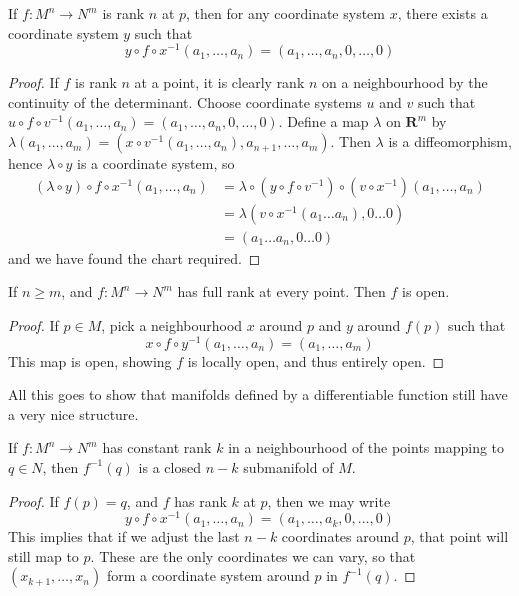 \begin{corollary}
    If $f: M^n \to N^m$ is rank $n$ at $p$, then for any coordinate system $x$, there exists a coordinate system $y$ such that
    \[ y \circ f \circ x^{-1} (a_1, \dots, a_n) = (a_1, \dots, a_n, 0, \dots, 0) \]
\end{corollary}
\begin{proof}
    If $f$ is rank $n$ at a point, it is clearly rank $n$ on a neighbourhood by the continuity of the determinant. Choose coordinate systems $u$ and $v$ such that $u \circ f \circ v^{-1}(a_1, \dots, a_n) = (a_1, \dots, a_n, 0, \dots, 0)$. Define a map $\lambda$ on $\mathbf{R}^m$ by $\lambda(a_1, \dots, a_m) = (x \circ v^{-1}(a_1, \dots, a_n), a_{n+1}, \dots, a_m)$. Then $\lambda$ is a diffeomorphism, hence $\lambda \circ y$ is a coordinate system, so
    \begin{align*}
        (\lambda \circ y) \circ f \circ x^{-1} (a_1, \dots, a_n) &= \lambda \circ (y \circ f \circ v^{-1}) \circ (v \circ x^{-1}) (a_1, \dots, a_n)\\
        &= \lambda (v \circ x^{-1} (a_1 \dots a_n), 0 \dots 0)\\
        &= (a_1 \dots a_n, 0 \dots 0)
    \end{align*}
    and we have found the chart required.
\end{proof}

\begin{theorem}
    If $n \geq m$, and $f:M^n \to N^m$ has full rank at every point. Then $f$ is open.
\end{theorem}
\begin{proof}
    If $p \in M$, pick a neighbourhood $x$ around $p$ and $y$ around $f(p)$ such that
    \[ x \circ f \circ y^{-1}(a_1, \dots, a_n) = (a_1, \dots, a_m) \]
    This map is open, showing $f$ is locally open, and thus entirely open.
\end{proof}

All this goes to show that manifolds defined by a differentiable function still have a very nice structure.

\begin{theorem}
    If $f: M^n \to N^m$ has constant rank $k$ in a neighbourhood of the points mapping to $q \in N$, then $f^{-1}(q)$ is a closed $n - k$ submanifold of $M$.
\end{theorem}
\begin{proof}
    If $f(p) = q$, and $f$ has rank $k$ at $p$, then we may write
    \[ y \circ f \circ x^{-1}(a_1, \dots, a_n) = (a_1, \dots, a_k, 0 ,\dots, 0) \]
    This implies that if we adjust the last $n - k$ coordinates around $p$, that point will still map to $p$. These are the only coordinates we can vary, so that $(x_{k+1}, \dots, x_n)$ form a coordinate system around $p$ in $f^{-1}(q)$.
\end{proof}

